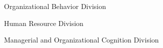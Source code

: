 \documentclass[12pt,letterpaper]{report} %
\newcommand{\listitemspace}{0em}
\renewenvironment{itemize}
{\begin{list}{}{\setlength{\leftmargin}{0em}
                \setlength{\parskip}{0em}
                \setlength{\itemsep}{\listitemspace}
                \setlength{\parsep}{\listitemspace}}}
{\end{list}}
\begin{document}
    \begin{itemize}

        \item Organizational Behavior Division
        \item Human Resource Division
        \item Managerial and Organizational Cognition Division

    \end{itemize}















\end{document}
